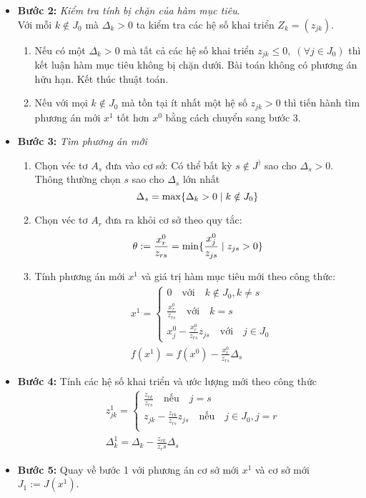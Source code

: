 \begin{itemize}
\begin{itemize}
\item[]{\bf Bước 2: }{\it Kiểm tra tính bị chặn của hàm mục tiêu}.\\
Với mỗi $k\notin J_0$ mà $\Delta_k > 0$  ta kiểm tra các hệ số khai triển $Z_k = (z_{jk})$.\\
\begin{enumerate}
\item Nếu có một $\Delta_k>0$ mà tất cả các hệ số khai triển $z_{jk}\leq 0,\;(\forall j\in J_0)$ thì kết luận hàm mục tiêu không bị chặn dưới. Bài toán không có phương án hữu hạn. Kết thúc thuật toán.\\
\item Nếu với mọi $k\notin J_0$ mà tồn tại ít nhất một hệ số $z_{jk}>0$ thì tiến hành tìm phương án mới $x^1$ tốt hơn $x^0$ bằng cách chuyển sang bước 3.
\end{enumerate}
\item[]{\bf Bước 3: }{\it Tìm phương án mới}
\begin{enumerate}
\item Chọn véc tơ $A_s$ đưa vào cơ sở: Có thể bất kỳ $s\notin J^)$ sao cho $\Delta_s>0$. Thông thường chọn $s$ sao cho $\Delta_s$ lớn nhất
$$
\Delta_s = \max\{\Delta_k > 0\;|\; k\notin J_0\}
$$
\item Chọn véc tơ $A_r$ đưa ra khỏi cơ sở theo quy tắc:
$$
\theta := \dfrac{x^0_{r}}{z_{rs}} = \min\{\dfrac{x^0_j}{z_{js}}\;|\; z_{js} > 0\}
$$
\item Tính phương án mới $x^1$ và giá trị hàm mục tiêu mới theo công thức:
\begin{align*}
&x^1=\begin{cases}
0\quad\text{với}\quad k\notin J_0, k\neq s\\
\frac{x^0_r}{z_{rs}}\quad\text{với}\quad k = s\\
x^0_j - \frac{x^0_r}{z_{rs}}z_{js} \quad\text{với}\quad j\in J_0
\end{cases}\\
&f(x^1) = f(x^0) - \frac{x^0_r}{z_{rs}}\Delta_s
\end{align*}
\end{enumerate}
\item[]{\bf Bước 4:} Tính các hệ số khai triển và ước lượng mới theo công thức
\begin{align*}
&z_{jk}^1 = \begin{cases}
\frac{z_{rk}}{z_{rs}}\quad \text{nếu}\quad j=s\\
z_{jk} - \frac{z_{rk}}{z_{rs}}z_{js}\quad \text{nếu}\quad j\in J_0, j=r\\
\end{cases}\\
&\Delta^1_k = \Delta_k - \frac{z_{rk}}{z_rs}\Delta_s
\end{align*}
\item[]{\bf Bước 5:} Quay về bước 1 với phương án cơ sở mới $x^1$ và cơ sở mới $J_1:=J(x^1)$.
\end{itemize}
\end{itemize}
